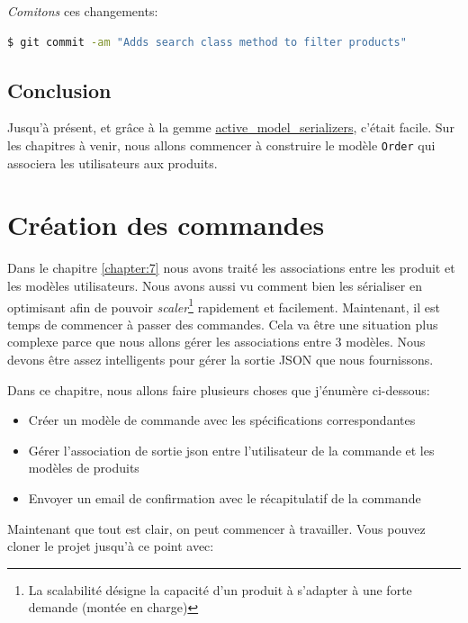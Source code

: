 \documentclass[]{report}
\begin{document}
      \textit{Comitons} ces changements:

      \begin{scriptsize}
        \begin{lstlisting}[language=bash]
        $ git commit -am "Adds search class method to filter products"
        \end{lstlisting}
      \end{scriptsize}

  \section{Conclusion}

    Jusqu'à présent, et grâce à la gemme \href{https://github.com/rails-api/active_model_serializers}{active\_model\_serializers}, c'était facile. Sur les chapitres à venir, nous allons commencer à construire le modèle \verb|Order| qui associera les utilisateurs aux produits.

\chapter{Création des commandes}\label{chapter:8}

  Dans le chapitre \ref{chapter:7} nous avons traité les associations entre les produit et les modèles utilisateurs. Nous avons aussi vu comment bien les sérialiser en optimisant afin de pouvoir \textit{scaler}\footnote{La scalabilité désigne la capacité d'un produit à s'adapter à une forte  demande (montée en charge)} rapidement et facilement. Maintenant, il est temps de commencer à passer des commandes. Cela va être une situation plus complexe parce que nous allons gérer les associations entre 3 modèles. Nous devons être assez intelligents pour gérer la sortie JSON que nous fournissons.

  Dans ce chapitre, nous allons faire plusieurs choses que j'énumère ci-dessous:

  \begin{itemize}
    \item Créer un modèle de commande avec les spécifications correspondantes
    \item Gérer l'association de sortie json entre l'utilisateur de la commande et les modèles de produits
    \item Envoyer un email de confirmation avec le récapitulatif de la commande
  \end{itemize}

  Maintenant que tout est clair, on peut commencer à travailler. Vous pouvez cloner le projet jusqu'à ce point avec:
\end{document}
